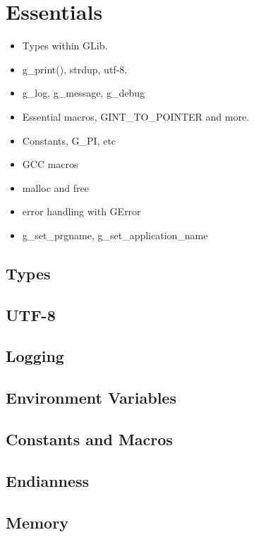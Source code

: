 \chapter{Essentials}

\begin{itemize}
\item Types within GLib.
\item g\_print(), strdup, utf-8.
\item g\_log, g\_message, g\_debug
\item Essential macros, GINT\_TO\_POINTER and more.
\item Constants, G\_PI, etc
\item GCC macros
\item malloc and free
\item error handling with GError
\item g\_set\_prgname, g\_set\_application\_name
\end{itemize}

\section{Types}

\section{UTF-8}

\section{Logging}

\section{Environment Variables}

\section{Constants and Macros}

\section{Endianness}

\section{Memory}

